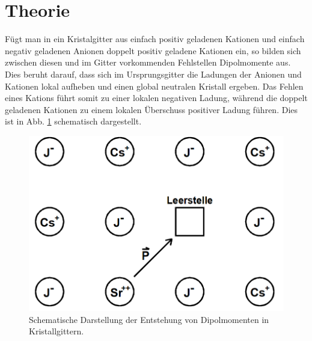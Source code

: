 \section{Theorie}
\label{sec:Theorie}

Fügt man in ein Kristalgitter aus einfach positiv geladenen Kationen und einfach negativ geladenen Anionen doppelt positiv geladene Kationen ein, so bilden sich zwischen diesen und im Gitter vorkommenden Fehlstellen Dipolmomente aus. Dies beruht darauf, dass sich im Ursprungsgitter die Ladungen der Anionen und Kationen lokal aufheben und einen global neutralen Kristall ergeben. Das Fehlen eines Kations führt somit zu einer lokalen negativen Ladung, während die doppelt geladenen Kationen zu einem lokalen Überschuss positiver Ladung führen. Dies ist in Abb. \ref{fig:fehlstelle} schematisch dargestellt.

\begin{figure}
  \centering
  \includegraphics{./logos/Fehlstelle.PNG}
  \caption{Schematische Darstellung der Entstehung von Dipolmomenten in Kristallgittern.\cite{Anleitung}}
  \label{fig:fehlstelle}
\end{figure}

